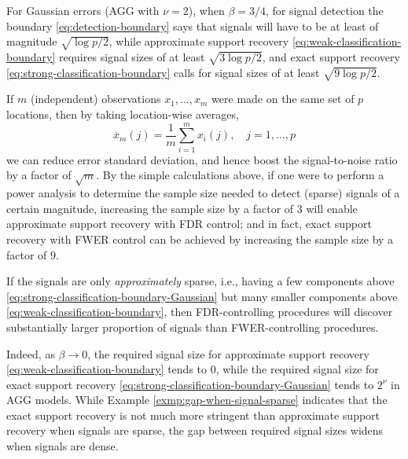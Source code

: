 \begin{example} \label{exmp:gap-when-signal-sparse}
For Gaussian errors (AGG with $\nu = 2$), when $\beta = 3/4$, for signal detection the boundary \eqref{eq:detection-boundary} says that signals will have to be at least of magnitude $\sqrt{\log{p}/2}$, 
while approximate support recovery \eqref{eq:weak-classification-boundary} requires signal sizes of at least $\sqrt{3\log{p}/2}$, 
and exact support recovery \eqref{eq:strong-classification-boundary} calls for signal sizes of at least $\sqrt{9\log{p}/2}$. 

If $m$ (independent) observations $x_1,\ldots,x_m$ were made on the same set of $p$ locations, then by taking location-wise averages, $$\overline{x}_{m}(j) = \frac{1}{m}\sum_{i=1}^{m} x_i(j), \quad j=1,\ldots,p$$
we can reduce error standard deviation, and hence boost the signal-to-noise ratio by a factor of $\sqrt{m}$.
By the simple calculations above, if one were to perform a power analysis to determine the sample size needed to detect (sparse) signals of a certain magnitude, increasing the sample size by a factor of $3$ will enable approximate support recovery with FDR control; and in fact, exact support recovery with FWER control can be achieved by increasing the sample size by a factor of $9$.
\end{example}

\begin{remark}
If the signals are only \emph{approximately} sparse, i.e., having a few components above \eqref{eq:strong-classification-boundary-Gaussian} but many smaller components above \eqref{eq:weak-classification-boundary}, then FDR-controlling procedures will discover substantially larger proportion of signals than FWER-controlling procedures.

Indeed, as $\beta\to0$, the required signal size for approximate support recovery \eqref{eq:weak-classification-boundary} tends to 0, while the required signal size for exact support recovery \eqref{eq:strong-classification-boundary-Gaussian} tends to $2^\nu$ in AGG models.
While Example \ref{exmp:gap-when-signal-sparse} indicates that the exact support recovery is not much more stringent than approximate support recovery when signals are sparse, the gap between required signal sizes widens when signals are dense. 
\end{remark}

